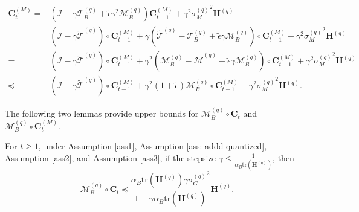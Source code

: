 \documentclass[11pt, letterpaper]{article}
\begin{document}
\begin{equation}
\label{initial CtM}
    \begin{aligned}
        \mathbf{C}_t^{(M)}=&(\mathcal{I}-\gamma \mathcal{T}_B^{(q)}+\tilde{\epsilon}\gamma^2\mathcal{M}_B^{(q)})\mathbf{C}_{t-1}^{(M)}+\gamma^2 {\sigma_M^{(q)}}^2\mathbf{H}^{(q)}\\
        =&(\mathcal{I}-\gamma\widetilde{\mathcal{T}}^{(q)})\circ \mathbf{C}_{t-1}^{(M)}+\gamma(\widetilde{\mathcal{T}}^{(q)}-\mathcal{T}_B^{(q)}+\tilde{\epsilon}\gamma\mathcal{M}_B^{(q)})\circ \mathbf{C}_{t-1}^{(M)}+\gamma^2{\sigma_M^{(q)}}^2\mathbf{H}^{(q)}\\
        =&(\mathcal{I}-\gamma\widetilde{\mathcal{T}}^{(q)})\circ \mathbf{C}_{t-1}^{(M)}+\gamma^2(\mathcal{M}_B^{(q)}-\widetilde{\mathcal{M}}^{(q)}+\tilde{\epsilon}\gamma\mathcal{M}_B^{(q)})\circ \mathbf{C}_{t-1}^{(M)}+\gamma^2{\sigma_M^{(q)}}^2\mathbf{H}^{(q)}\\
        \preceq&(\mathcal{I}-\gamma\widetilde{\mathcal{T}}^{(q)})\circ \mathbf{C}_{t-1}^{(M)}+\gamma^2(1+\tilde{\epsilon})\mathcal{M}_B^{(q)}\circ \mathbf{C}_{t-1}^{(M)}+\gamma^2{\sigma_M^{(q)}}^2\mathbf{H}^{(q)}.
    \end{aligned}
\end{equation}

The following two lemmas provide upper bounds for $\mathcal{M}_B^{(q)} \circ \mathbf{C}_t$ and $\mathcal{M}_B^{(q)} \circ \mathbf{C}_t^{(M)}$.

\begin{lemma}
    \label{A bound for M_B^{(q)} C_t}
    For $t \geq 1$, under Assumption \ref{ass1}, Assumption \ref{ass: addd quantized}, Assumption \ref{ass2}, and Assumption \ref{ass3}, if the stepsize $\gamma \leq \frac{1}{\alpha_B\mathrm{tr}(\mathbf{H}^{(q)})}$, then
    \begin{equation*}
        \mathcal{M}_B^{(q)} \circ \mathbf{C}_t \preceq \frac{\alpha_B\mathrm{tr}(\mathbf{H}^{(q)})\gamma{\sigma_G^{(q)}}^2}{1-\gamma\alpha_B\mathrm{tr}(\mathbf{H}^{(q)})} \mathbf{H}^{(q)}.
    \end{equation*}
\end{lemma}
\end{document}
